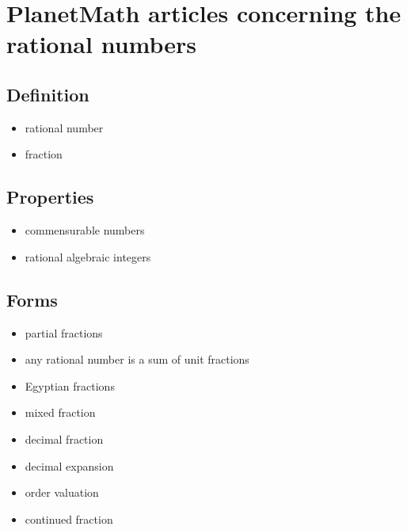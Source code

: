 \documentclass[12pt]{article}
\theoremstyle{definition}
\begin{document}
\section*{PlanetMath articles concerning the rational numbers}


 

    \subsection*{Definition}
\begin{itemize}

\item rational number

\item fraction

\end{itemize}


    \subsection*{Properties}
\begin{itemize}

\item commensurable numbers

\item rational algebraic integers

\end{itemize}

    \subsection*{Forms}
\begin{itemize}

\item partial fractions

\item any rational number is a sum of unit fractions

\item Egyptian fractions

\item mixed fraction

\item decimal fraction

\item decimal expansion

\item order valuation

\item continued fraction

\end{itemize}
\end{document}

